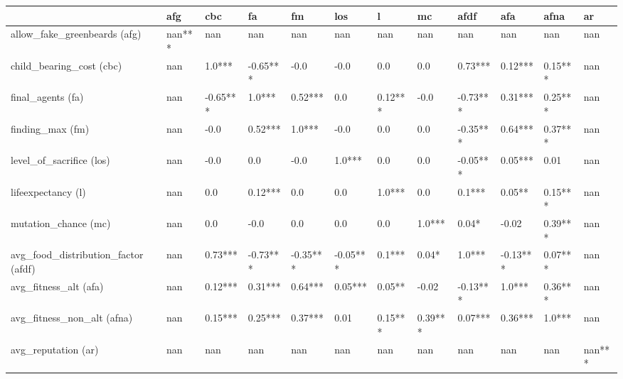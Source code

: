 \begin{tabular}{llllllllllll}
    \toprule
    {}                                     & afg    & cbc      & fa       & fm       & los      & l       & mc      & afdf     & afa      & afna    & ar     \\
    \midrule
    allow\_fake\_greenbeards (afg)         & nan*** & nan      & nan      & nan      & nan      & nan     & nan     & nan      & nan      & nan     & nan    \\
    child\_bearing\_cost (cbc)             & nan    & 1.0***   & -0.65*** & -0.0     & -0.0     & 0.0     & 0.0     & 0.73***  & 0.12***  & 0.15*** & nan    \\
    final\_agents (fa)                     & nan    & -0.65*** & 1.0***   & 0.52***  & 0.0      & 0.12*** & -0.0    & -0.73*** & 0.31***  & 0.25*** & nan    \\
    finding\_max (fm)                      & nan    & -0.0     & 0.52***  & 1.0***   & -0.0     & 0.0     & 0.0     & -0.35*** & 0.64***  & 0.37*** & nan    \\
    level\_of\_sacrifice (los)             & nan    & -0.0     & 0.0      & -0.0     & 1.0***   & 0.0     & 0.0     & -0.05*** & 0.05***  & 0.01    & nan    \\
    lifeexpectancy (l)                     & nan    & 0.0      & 0.12***  & 0.0      & 0.0      & 1.0***  & 0.0     & 0.1***   & 0.05**   & 0.15*** & nan    \\
    mutation\_chance (mc)                  & nan    & 0.0      & -0.0     & 0.0      & 0.0      & 0.0     & 1.0***  & 0.04*    & -0.02    & 0.39*** & nan    \\
    avg\_food\_distribution\_factor (afdf) & nan    & 0.73***  & -0.73*** & -0.35*** & -0.05*** & 0.1***  & 0.04*   & 1.0***   & -0.13*** & 0.07*** & nan    \\
    avg\_fitness\_alt (afa)                & nan    & 0.12***  & 0.31***  & 0.64***  & 0.05***  & 0.05**  & -0.02   & -0.13*** & 1.0***   & 0.36*** & nan    \\
    avg\_fitness\_non\_alt (afna)          & nan    & 0.15***  & 0.25***  & 0.37***  & 0.01     & 0.15*** & 0.39*** & 0.07***  & 0.36***  & 1.0***  & nan    \\
    avg\_reputation (ar)                   & nan    & nan      & nan      & nan      & nan      & nan     & nan     & nan      & nan      & nan     & nan*** \\
    \bottomrule
\end{tabular}
